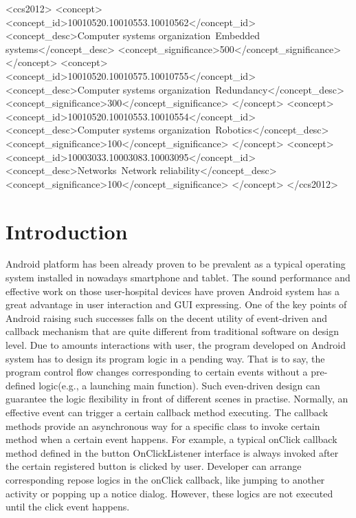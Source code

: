 \documentclass{sig-alternate-05-2015}
\begin{document}
%
%
\begin{CCSXML}
<ccs2012>
 <concept>
  <concept_id>10010520.10010553.10010562</concept_id>
  <concept_desc>Computer systems organization~Embedded systems</concept_desc>
  <concept_significance>500</concept_significance>
 </concept>
 <concept>
  <concept_id>10010520.10010575.10010755</concept_id>
  <concept_desc>Computer systems organization~Redundancy</concept_desc>
  <concept_significance>300</concept_significance>
 </concept>
 <concept>
  <concept_id>10010520.10010553.10010554</concept_id>
  <concept_desc>Computer systems organization~Robotics</concept_desc>
  <concept_significance>100</concept_significance>
 </concept>
 <concept>
  <concept_id>10003033.10003083.10003095</concept_id>
  <concept_desc>Networks~Network reliability</concept_desc>
  <concept_significance>100</concept_significance>
 </concept>
</ccs2012>  
\end{CCSXML}



%
%

%
%
\printccsdesc



\section{Introduction}
Android platform has been already proven to be prevalent as a typical operating system installed in nowadays smartphone and tablet. The sound performance and effective work on those user-hospital devices have proven Android system has a great advantage in user interaction and GUI expressing. One of the key points of Android raising such successes falls on the decent utility of event-driven and callback mechanism that are quite different from traditional software on design level. Due to amounts interactions with user, the program developed on Android system has to design its program logic in a pending way.  That is to say, the program control flow changes corresponding to certain events without a pre-defined logic(e.g., a launching main function). Such even-driven design can guarantee the logic flexibility in front of different scenes in practise. Normally, an effective event can trigger a certain callback method executing. The callback methods provide an asynchronous way for a specific class to invoke certain method when a certain event happens. For example, a typical onClick callback method defined in the button OnClickListener interface is always invoked after the certain registered button is clicked by user. Developer can arrange corresponding repose logics in the onClick callback, like jumping to another activity or popping up a notice dialog. However, these logics are not executed until the click event happens.
\end{document}
